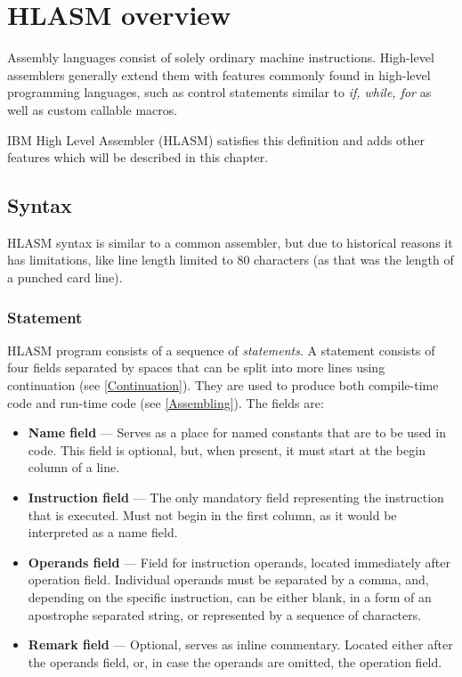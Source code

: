 \chapter{HLASM overview}

Assembly languages consist of solely ordinary machine instructions. High-level assemblers generally extend them with features commonly found in high-level programming languages, such as control statements similar to \emph{if, while, for} as well as custom callable macros.

IBM High Level Assembler (HLASM) satisfies this definition and adds other features which will be described in this chapter.

\section{Syntax}

HLASM syntax is similar to a common assembler, but due to historical reasons it has limitations, like line length limited to 80 characters (as that was the length of a punched card line).

\subsection{Statement}

HLASM program consists of a sequence of \emph{statements}. A statement consists of four fields separated by spaces that can be split into more lines using continuation (see \cref{Continuation}). They are used to produce both compile-time code and run-time code (see \cref{Assembling}). The fields are:
\begin{itemize}
	\item \textbf{Name field} --- Serves as a place for named constants that are to be used in code. This field is optional, but, when present, it must start at the begin column of a line.
	
	\item \textbf{Instruction field} --- The only mandatory field representing the instruction that is executed. Must not begin in the first column, as it would be interpreted as a name field.
	
	\item \textbf{Operands field} --- Field for instruction operands, located immediately after operation field. Individual operands must be separated by a comma, and, depending on the specific instruction, can be either blank, in a form of an apostrophe separated string, or represented by a sequence of characters.
	
	\item \textbf{Remark field} --- Optional, serves as inline commentary. Located either after the operands field, or, in case the operands are omitted, the operation field. 
\end{itemize}


